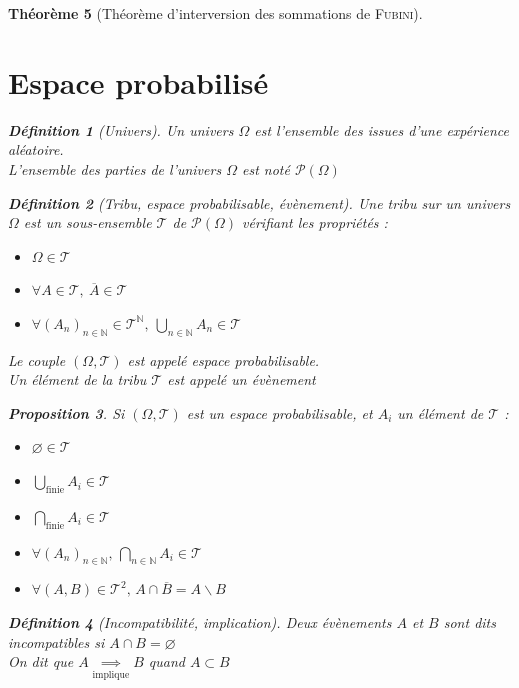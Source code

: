 \documentclass[11pt,a4paper]{report}
\newtheorem{theorem}{Théorème}[chapter]
\newtheorem{prop}[theorem]{Proposition}
\theoremstyle{definition}
\newtheorem{dfn}[theorem]{Définition}
\begin{document}
\begin{theorem}[Théorème d'interversion des sommations de \textsc{Fubini}]
{{\section{Espace probabilisé} %
\label{sec:espace_probabilise}
\begin{dfn}[Univers]
     Un \emph{univers} $\Omega$ est l'ensemble des issues d'une expérience aléatoire.\\
     L'ensemble des parties de l'univers $\Omega$ est noté $\mathscr{P}(\Omega{})$
\end{dfn}
\begin{dfn}[Tribu, espace probabilisable, évènement]
     Une \emph{tribu} sur un univers $\Omega$ est un sous-ensemble $\mathscr{T}$ de $\mathscr{P}(\Omega{})$ vérifiant les propriétés :
     \begin{itemize}
         \item $\Omega \in \mathscr{T}$
         \item $\forall A \in \mathscr{T},\: \overline{A} \in \mathscr{T}$
         \item $\forall \left( A_n \right)_{n\in \mathbb{N}} \in \mathscr{T}^\mathbb{N},\: \bigcup_{n\in \mathbb{N}} A_n \in \mathscr{T}$
     \end{itemize}
     Le couple $(\Omega, \mathscr{T})$ est appelé \emph{espace probabilisable}.\\
     Un élément de la tribu $\mathscr{T}$ est appelé un \emph{évènement}
\end{dfn}
\begin{prop}
     Si $(\Omega, \mathscr{T})$ est un espace probabilisable, et $A_i$ un élément de $\mathscr{T}$ :
     \begin{itemize}
         \item $\varnothing \in \mathscr{T}$
         \item $\bigcup_\text{finie} A_i \in \mathscr{T}$
         \item $\bigcap_\text{finie} A_i \in \mathscr{T}$
         \item $\forall (A_n)_{n\in \mathbb{N}},\, \bigcap_{n\in \mathbb{N}} A_i \in \mathscr{T}$
         \item $\forall (A,B) \in \mathscr{T}^2,\, A\cap \overline{B} = A \backslash B$
     \end{itemize}
\end{prop}
\begin{dfn}[Incompatibilité, implication]
     Deux évènements $A$ et $B$ sont dits \emph{incompatibles} si $A \cap B = \varnothing$\\
     On dit que $A \underset{\text{implique}}{\implies} B$ quand $A \subset B$
\end{dfn}
}}
\end{theorem}
\end{document}
